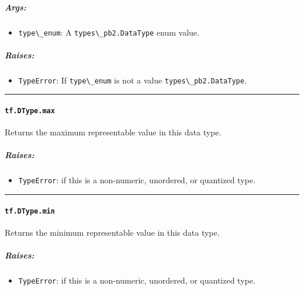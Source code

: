 \subparagraph{Args: }\label{args-19}

\begin{itemize}
\tightlist
\item
  \lstinline{type\_enum}: A \lstinline{types\_pb2.DataType} enum value.
\end{itemize}

\subparagraph{Raises: }\label{raises-10}

\begin{itemize}
\tightlist
\item
  \lstinline{TypeError}: If \lstinline{type\_enum} is not a value
  \lstinline{types\_pb2.DataType}.
\end{itemize}

\begin{center}\rule{0.5\linewidth}{\linethickness}\end{center}

\paragraph{\texorpdfstring{\lstinline{tf.DType.max}
}{tf.DType.max }}\label{tf.dtype.max}

Returns the maximum representable value in this data type.

\subparagraph{Raises: }\label{raises-11}

\begin{itemize}
\tightlist
\item
  \lstinline{TypeError}: if this is a non-numeric, unordered, or quantized
  type.
\end{itemize}

\begin{center}\rule{0.5\linewidth}{\linethickness}\end{center}

\paragraph{\texorpdfstring{\lstinline{tf.DType.min}
}{tf.DType.min }}\label{tf.dtype.min}

Returns the minimum representable value in this data type.

\subparagraph{Raises: }\label{raises-12}

\begin{itemize}
\tightlist
\item
  \lstinline{TypeError}: if this is a non-numeric, unordered, or quantized
  type.
\end{itemize}

